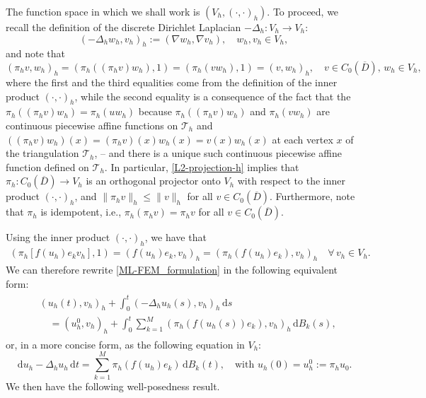 \documentclass[12pt]{article}
\newcommand{\dd}{\,\mathrm{d}}
\begin{document}
{  

The function space in which we shall work is $(V_h, (\cdot, \cdot)_h)$. 
%
To proceed, we recall the definition of the discrete Dirichlet Laplacian $-\Delta_h : V_h \to V_h$:
%
\begin{equation}\label{def:Delta_h-h}
    (-\Delta_h w_h, v_h)_h := (\nabla w_h, \nabla v_h), \quad  w_h, v_h \in V_h,
\end{equation}
%
and note that 
\begin{equation}\label{L2-projection-h}
    (\pi_h v, w_h)_h = (\pi_h((\pi_h v )w_h), 1) = (\pi_h(v w_h),1)  = (v, w_h)_h, \quad v \in C_0(\overline{D}),\,  w_h \in V_h,
\end{equation}
where the first and the third equalities come from the definition of the inner product $(\cdot,\cdot)_h$, while the second equality is a consequence of the fact  that the $\pi_h((\pi_h v)w_h) = \pi_h(uw_h)$ because $\pi_h((\pi_hv)w_h)$ and $\pi_h(vw_h)$ are continuous piecewise affine functions on $\mathcal{T}_h$ and $((\pi_hv)w_h)(x) = (\pi_hv)(x) w_h(x) = v(x)w_h(x)$ at each vertex $x$ of the triangulation $\mathcal{T}_h$, -- and there is a unique such continuous piecewise affine function defined on $\mathcal{T}_h$.
In particular, \eqref{L2-projection-h} implies that $\pi_h: C_0(\overline{D}) \to V_h$ is an orthogonal projector onto $V_h$ with respect to the inner product $(\cdot,\cdot)_h$, and $\|\pi_h v\|_h \leq \|v\|_h$ for all $v \in C_0(\overline{D})$.
Furthermore, note that $\pi_h$ is idempotent, i.e., $\pi_h (\pi_h v) = \pi_h v$ for all $v \in C_0(\overline{D})$. 

Using the inner product $(\cdot,\cdot)_h$, we have that
%
\begin{align*}
    (\pi_h[f(u_h) e_k v_h],1) = (f(u_h)e_k, v_h)_h = (\pi_h(f(u_h)e_k), v_h)_h \quad \forall\, v_h \in V_h.
\end{align*}
%
We can therefore rewrite \eqref{ML-FEM_formulation} in the following equivalent form:
%
\begin{align}\begin{aligned}\label{FEM-formulation-h-product}
    &(u_h(t), v_h)_h + \int_0^t (-\Delta_h u_h(s), v_h)_h \dd s \\ &\quad = 
    (u_h^0, v_h)_h + \int_0^t \sum_{k=1}^M (\pi_h(f(u_h(s))e_k), v_h)_h \dd B_k(s),
\end{aligned}\end{align}
%
or, in a more concise form, as the following equation in $V_h$:
%
\begin{equation}\label{FEM-formulation-strong}
    \dd u_h - \Delta_h u_h \dd t = \sum_{k=1}^M \pi_h(f(u_h)e_k) \dd B_k(t), \quad \mbox{with $u_h(0)=u_h^0:=\pi_h u_0$.}
\end{equation}
%
We then have the following well-posedness result. 

}
\end{document}
